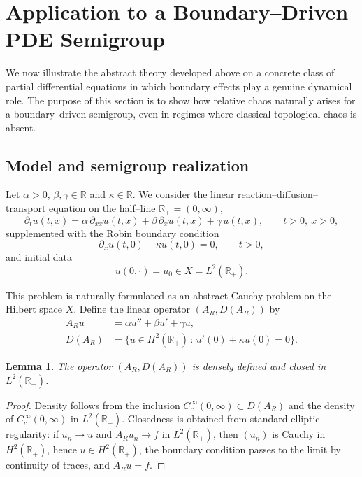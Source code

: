 \documentclass[12pt]{article}
\newtheorem{lemma}[theorem]{Lemma}
\begin{document}
\section{Application to a Boundary--Driven PDE Semigroup}\label{ABDPDES}

We now illustrate the abstract theory developed above on a concrete class of partial differential equations in which boundary effects play a genuine dynamical role. The purpose of this section is to show how relative chaos naturally arises for a boundary--driven semigroup, even in regimes where classical topological chaos is absent.

\subsection{Model and semigroup realization}

Let $\alpha>0$, $\beta,\gamma\in\mathbb{R}$ and $\kappa\in\mathbb{R}$. We consider the linear reaction--diffusion--transport equation on the half--line $\mathbb{R}_+=(0,\infty)$,
\begin{equation}\label{eq:pde_model}
\partial_t u(t,x)
=
\alpha\,\partial_{xx}u(t,x)
+
\beta\,\partial_x u(t,x)
+
\gamma\,u(t,x),
\qquad t>0,\ x>0,
\end{equation}
supplemented with the Robin boundary condition
\begin{equation}\label{eq:robin_bc}
\partial_x u(t,0)+\kappa u(t,0)=0,
\qquad t>0,
\end{equation}
and initial data
\[
u(0,\cdot)=u_0\in X=L^2(\mathbb{R}_+).
\]

This problem is naturally formulated as an abstract Cauchy problem on the Hilbert space $X$. Define the linear operator $(A_R,D(A_R))$ by
\begin{align*}
A_R u &= \alpha u''+\beta u'+\gamma u,\\
D(A_R)
&=
\bigl\{
u\in H^2(\mathbb{R}_+)\,:\,
u'(0)+\kappa u(0)=0
\bigr\}.
\end{align*}

\begin{lemma}\label{lem:AR_closed_dense}
The operator $(A_R,D(A_R))$ is densely defined and closed in $L^2(\mathbb{R}_+)$.
\end{lemma}

\begin{proof}
Density follows from the inclusion $C_c^\infty(0,\infty)\subset D(A_R)$ and the density of $C_c^\infty(0,\infty)$ in $L^2(\mathbb{R}_+)$.  Closedness is obtained from standard elliptic regularity: if
$u_n\to u$ and $A_Ru_n\to f$ in $L^2(\mathbb{R}_+)$, then $(u_n)$ is Cauchy in $H^2(\mathbb{R}_+)$, hence $u\in H^2(\mathbb{R}_+)$, the boundary condition passes to the limit by continuity of traces, and $A_Ru=f$.
\end{proof}
\end{document}
